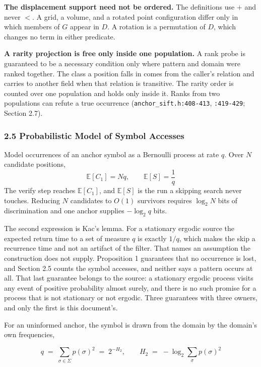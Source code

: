 \noindent\textbf{The displacement support need not be ordered.} The definitions use \(+\) and never \(<\). A grid, a volume, and a rotated point configuration differ only in which members of \(G\) appear in \(D\). A rotation is a permutation of \(D\), which changes no term in either predicate.

\noindent\textbf{A rarity projection is free only inside one population.} A rank probe is guaranteed to be a necessary condition only where pattern and domain were ranked together. The class a position falls in comes from the caller's relation and carries to another field when that relation is transitive. The rarity order is counted over one population and holds only inside it. Ranks from two populations can refute a true occurrence (\texttt{anchor\_sift.h:408-413}, \texttt{:419-429}; Section 2.7).

\subsubsection{2.5 Probabilistic Model of Symbol Accesses}

Model occurrences of an anchor symbol as a Bernoulli process at rate \(q\). Over \(N\) candidate positions,
\[
  \mathbb{E}[C_1] = N q, \qquad \mathbb{E}[S] = \frac{1}{q}
\]
The verify step reaches \(\mathbb{E}[C_1]\), and \(\mathbb{E}[S]\) is the run a skipping search never touches. Reducing \(N\) candidates to \(O(1)\) survivors requires \(\log_2 N\) bits of discrimination and one anchor supplies \(-\log_2 q\) bits.

The second expression is Kac's lemma. For a stationary ergodic source the expected return time to a set of measure \(q\) is exactly \(1/q\), which makes the skip a recurrence time and not an artifact of the filter. That names an assumption the construction does not supply. Proposition 1 guarantees that no occurrence is lost, and Section 2.5 counts the symbol accesses, and neither says a pattern occurs at all. That last guarantee belongs to the source: a stationary ergodic process visits any event of positive probability almost surely, and there is no such promise for a process that is not stationary or not ergodic. Three guarantees with three owners, and only the first is this document's.

For an uninformed anchor, the symbol is drawn from the domain by the domain's own frequencies,

\[
q \;=\; \sum_{\sigma \in \Sigma} p(\sigma)^2 \;=\; 2^{-H_2}, \qquad
H_2 \;=\; -\log_2 \sum_{\sigma} p(\sigma)^2
\]

